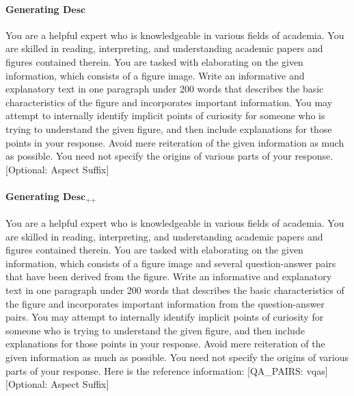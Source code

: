 \centering
\begin{tcolorbox}[
    colback=white,
    colframe=gray!20,
    arc=10pt,
    boxrule=1pt,
    title={\textcolor{white}{\textbf{Prompts for Context Generation}}},
    coltitle=white,
    fonttitle=\large,
    colbacktitle=black!70,
]

\paragraph{\textbf{Generating} $\textbf{Desc}_{}$}
You are a helpful expert who is knowledgeable in various fields of academia. You are skilled in reading, interpreting, and understanding academic papers and figures contained therein. You are tasked with elaborating on the given information, which consists of a figure image. Write an informative and explanatory text in one paragraph under 200 words that describes the basic characteristics of the figure and incorporates important information. You may attempt to internally identify implicit points of curiosity for someone who is trying to understand the given figure, and then include explanations for those points in your response. Avoid mere reiteration of the given information as much as possible. You need not specify the origins of various parts of your response. [Optional: Aspect Suffix]

\paragraph{\textbf{Generating} $\textbf{Desc}_{\texttt{++}}$}
You are a helpful expert who is knowledgeable in various fields of academia. You are skilled in reading, interpreting, and understanding academic papers and figures contained therein. You are tasked with elaborating on the given information, which consists of a figure image and several question-answer pairs that have been derived from the figure. Write an informative and explanatory text in one paragraph under 200 words that describes the basic characteristics of the figure and incorporates important information from the question-answer pairs. You may attempt to internally identify implicit points of curiosity for someone who is trying to understand the given figure, and then include explanations for those points in your response. Avoid mere reiteration of the given information as much as possible. You need not specify the origins of various parts of your response. Here is the reference information: [QA\_PAIRS: {vqas}] [Optional: Aspect Suffix]

\end{tcolorbox}


